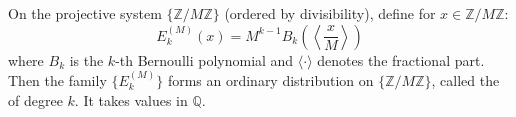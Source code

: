 On the projective system $\{\mathbb{Z}/M\mathbb{Z}\}$ (ordered by divisibility), define for $x \in \mathbb{Z}/M\mathbb{Z}$:
$$
E_k^{(M)}(x) = M^{k-1} B_k\!\left(\left\langle \frac{x}{M} \right\rangle\right)
$$
where $B_k$ is the $k$-th Bernoulli polynomial and $\langle \cdot \rangle$ denotes the fractional part. Then the family $\{E_k^{(M)}\}$ forms an ordinary distribution on $\{\mathbb{Z}/M\mathbb{Z}\}$, called the  of degree $k$. It takes values in $\mathbb{Q}$.
